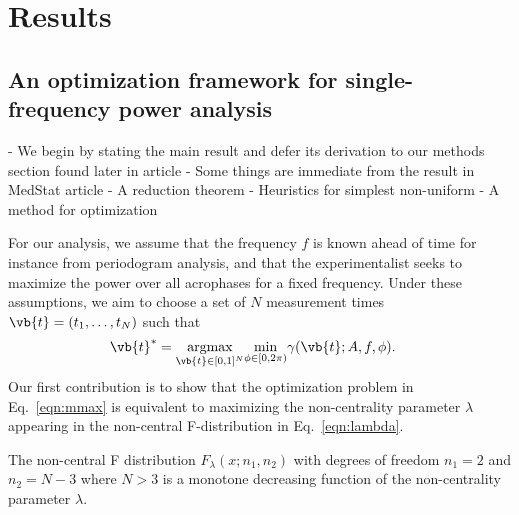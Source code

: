 \section{Results}\label{sec:results}
\subsection{An optimization framework for single-frequency power analysis}
- We begin by stating the main result and defer its derivation to our methods section found later in article
- Some things are immediate from the result in MedStat article
- A reduction theorem
- Heuristics for simplest non-uniform
- A method for optimization


For our analysis, we assume that the frequency $f$ is known ahead of time for instance from periodogram analysis, and that the experimentalist seeks to maximize the power over all acrophases for a fixed frequency. Under these assumptions, we aim to choose a set of $N$ measurement times $\vb{t}=(t_1,\ldots,t_N)$ such that
\begin{align}
\vb{t}^* &= \underset{\vb{t} \in [0,1]^{N}}{\textrm{argmax}} \underset{\phi \in [0,2\pi)}{\textrm{min}}  \gamma(\vb{t};A,f,\phi)  \label{eqn:mmax}.
\end{align}
Our first contribution is to show that the optimization problem in Eq.~\eqref{eqn:mmax} is equivalent to maximizing the non-centrality parameter $\lambda$ appearing in the non-central F-distribution in Eq.~\eqref{eqn:lambda}.
\begin{prop}
    The non-central F distribution $F_\lambda(x;n_1,n_2)$ with degrees of freedom $n_1=2$ and $n_2=N-3$ where $N>3$ is a monotone decreasing function of the non-centrality parameter $\lambda$. 
\end{prop}

